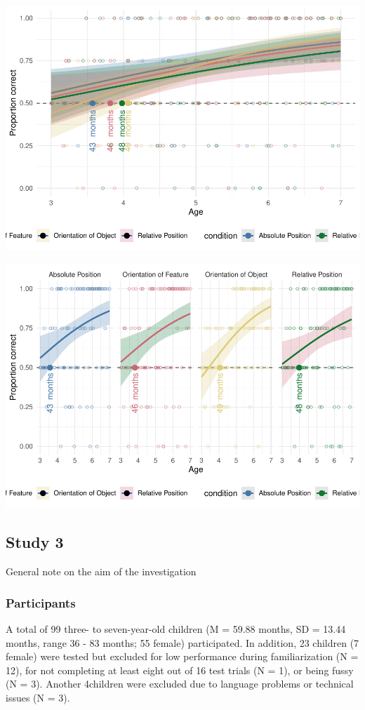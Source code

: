 \documentclass[
  man]{apa6}
\begin{document}
\includegraphics{symlit_rep_manuscript_files/figure-latex/S2_bayes_plot-1.pdf}

\includegraphics{symlit_rep_manuscript_files/figure-latex/S2_mixbayes_plot-1.pdf}

\subsection{Study 3}\label{study-3}

General note on the aim of the investigation

\subsubsection{Participants}\label{participants-2}

A total of 99 three- to seven-year-old children (M = 59.88 months, SD = 13.44 months, range 36 - 83 months; 55 female) participated. In addition, 23 children (7 female) were tested but excluded for low performance during familiarization (N = 12), for not completing at least eight out of 16 test trials (N = 1), or being fussy (N = 3). Another 4children were excluded due to language problems or technical issues (N = 3).
\end{document}
